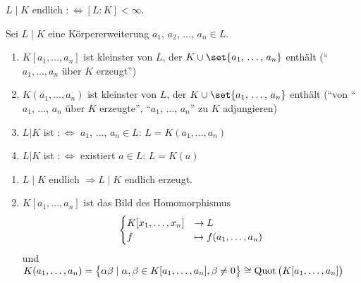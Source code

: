 \begin{definition}
	$L\mid K$ endlich $:\Leftrightarrow [L:K] < \infty$.
\end{definition}


\begin{definition}
	Sei $L\mid K$ eine Körpererweiterung $a_1$, $a_2$, $\dots$, $a_n \in L$.
	\begin{enumerate}[label=(\alph*)]
		\item $K[a_1,\dots,a_n]$ ist kleinster  von $L$, der $K \cup \set{a_1,\, \dots,\, a_n}$ enthält (``$a_1, \dots, a_n$ über $K$ erzeugt'')
		\item $K(a_1,\dots,a_n)$ ist kleinster  von $L$, der $K \cup \set{a_1,\, \dots,\, a_n}$ enthält (``von ``$a_1$, $\dots$, $a_n$ über $K$ erzeugte'', ``$a_1$, $\dots$, $a_n$'' zu $K$ adjungieren)
		\item $L | K$ ist  $:\Leftrightarrow$ $a_1$, $\dots$, $a_n \in L$: $L=K(a_1, \dots, a_n)$
		\item $L | K$ ist  $:\Leftrightarrow$ existiert $a \in L$: $L=K(a)$  
	\end{enumerate}
\end{definition}

\begin{remark}
	\begin{enumerate}[label=(\alph*)]
		\item $L\mid K$ endlich $\Rightarrow L\mid K$ endlich erzeugt.
		\item $K[a_1, \dots, a_n]$ ist das Bild des Homomorphismus
		\begin{align}
		\begin{cases}
		K[x_1, \dots, x_n] &\to L\\
		f &\mapsto f(a_1, \dots, a_n)
		\end{cases}\notag
		\end{align}
		und $K(a_1, \dots , a_n) = \big\{\alpha \beta \mid \alpha, \beta \in K[a_1, \dots, a_n], \beta \neq 0\big\} \cong \operatorname{Quot}\big(K[a_1, \dots, a_n]\big)$
	\end{enumerate}
\end{remark}
